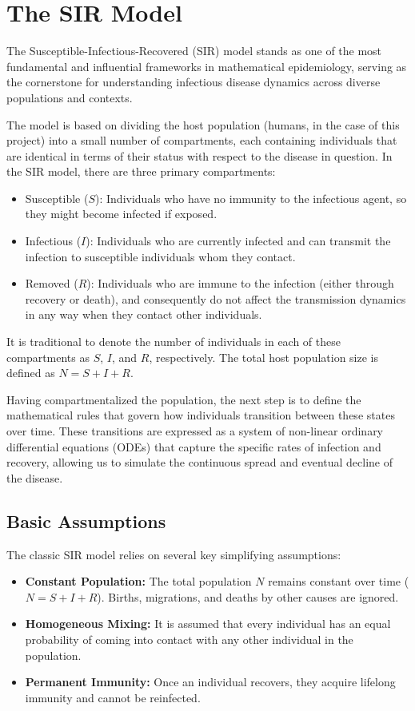 \documentclass[12pt,a4paper]{article}
\begin{document}
\section{The SIR Model}

The Susceptible-Infectious-Recovered (SIR) model stands as one of the most fundamental and influential frameworks in
mathematical epidemiology, serving as the cornerstone for understanding infectious disease dynamics across diverse
populations and contexts.

The model is based on dividing the host population (humans, in the case of this project) into a small number of compartments, each containing individuals that are identical in terms of their status with respect to the disease in question. In the SIR model, there are three primary compartments:
\begin{itemize}
    \item Susceptible ($S$): Individuals who have no immunity to the infectious agent, so they might become infected if exposed.
    \item Infectious ($I$): Individuals who are currently infected and can transmit the infection to susceptible individuals whom they contact.
    \item Removed ($R$): Individuals who are immune to the infection (either through recovery or death), and consequently do not affect the transmission dynamics in any way when they contact other individuals.
\end{itemize}
It is traditional to denote the number of individuals in each of these compartments as $S$, $I$, and $R$, respectively. The total host population size is defined as $N = S + I + R$.

Having compartmentalized the population, the next step is to define the mathematical rules that govern how individuals transition between these states over time. These transitions are expressed as a system of non-linear ordinary differential equations (ODEs) that capture the specific rates of infection and recovery, allowing us to simulate the continuous spread and eventual decline of the disease.

\subsection{Basic Assumptions}
The classic SIR model relies on several key simplifying assumptions:
\begin{itemize}
    \item \textbf{Constant Population:} The total population $N$ remains constant over time ($N = S + I + R$). Births, migrations, and deaths by other causes are ignored.
    \item \textbf{Homogeneous Mixing:} It is assumed that every individual has an equal probability of coming into contact with any other individual in the population.
    \item \textbf{Permanent Immunity:} Once an individual recovers, they acquire lifelong immunity and cannot be reinfected.
\end{itemize}
\end{document}
